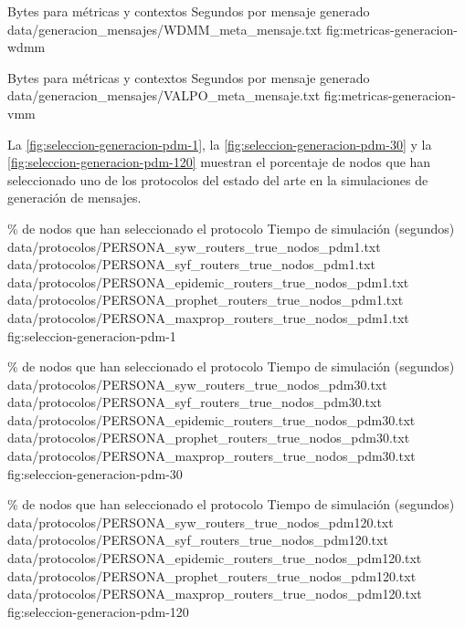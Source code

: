 {
\graficoProtocolo
{Bytes para métricas y contextos}
{Segundos por mensaje generado}
{data/generacion_mensajes/WDMM_meta_mensaje.txt}
}{fig:metricas-generacion-wdmm}



{
\graficoProtocolo
{Bytes para métricas y contextos}
{Segundos por mensaje generado}
{data/generacion_mensajes/VALPO_meta_mensaje.txt}
}{fig:metricas-generacion-vmm}


La \ref{fig:seleccion-generacion-pdm-1}, la
\ref{fig:seleccion-generacion-pdm-30} y la
\ref{fig:seleccion-generacion-pdm-120} muestran el porcentaje de nodos que han
seleccionado uno de los protocolos del estado del arte en la simulaciones de
generación de mensajes.


{
\graficoProtocolosTiempo
{\% de nodos que han seleccionado el protocolo}
{Tiempo de simulación (segundos)}
{data/protocolos/PERSONA_syw_routers_true_nodos_pdm1.txt}
{data/protocolos/PERSONA_syf_routers_true_nodos_pdm1.txt}
{data/protocolos/PERSONA_epidemic_routers_true_nodos_pdm1.txt}
{data/protocolos/PERSONA_prophet_routers_true_nodos_pdm1.txt}
{data/protocolos/PERSONA_maxprop_routers_true_nodos_pdm1.txt}
}{fig:seleccion-generacion-pdm-1}


{
\graficoProtocolosTiempo
{\% de nodos que han seleccionado el protocolo}
{Tiempo de simulación (segundos)}
{data/protocolos/PERSONA_syw_routers_true_nodos_pdm30.txt}
{data/protocolos/PERSONA_syf_routers_true_nodos_pdm30.txt}
{data/protocolos/PERSONA_epidemic_routers_true_nodos_pdm30.txt}
{data/protocolos/PERSONA_prophet_routers_true_nodos_pdm30.txt}
{data/protocolos/PERSONA_maxprop_routers_true_nodos_pdm30.txt}
}{fig:seleccion-generacion-pdm-30}


{
\graficoProtocolosTiempo
{\% de nodos que han seleccionado el protocolo}
{Tiempo de simulación (segundos)}
{data/protocolos/PERSONA_syw_routers_true_nodos_pdm120.txt}
{data/protocolos/PERSONA_syf_routers_true_nodos_pdm120.txt}
{data/protocolos/PERSONA_epidemic_routers_true_nodos_pdm120.txt}
{data/protocolos/PERSONA_prophet_routers_true_nodos_pdm120.txt}
{data/protocolos/PERSONA_maxprop_routers_true_nodos_pdm120.txt}
}{fig:seleccion-generacion-pdm-120}


